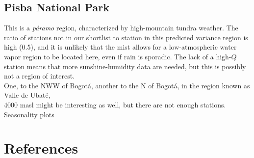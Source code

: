 \documentclass[12pt]{iopart}
\begin{document}
\subsection{Pisba National Park}

This is a \emph{p\'aramo} region, characterized by high-mountain tundra weather. The ratio of stations not in our shortlist to station in this predicted variance region is high (0.5), and it is unlikely that the mist allows for a low-atmospheric water vapor region to be located here, even if rain is sporadic. The lack of a high-$Q$ station means that more sunshine-humidity data are needed, but this is possibly not a region of interest.\\



One, to the NWW of Bogot\'a, another to the N of Bogot\'a, in the region known as Valle de Ubat\'e, \\

4000 masl might be interesting as well, but there are not enough stations.\\

Seasonality plots\\

 


  

 \section*{References}
 

  
  
\end{document}
